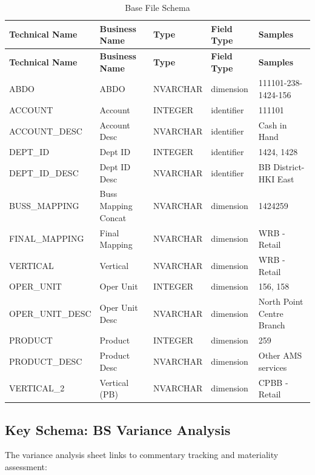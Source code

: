 \documentclass[11pt,a4paper]{article}
\begin{document}
\begin{longtable}{lllll}
\caption{Base File Schema} \\
\toprule
\textbf{Technical Name} & \textbf{Business Name} & \textbf{Type} & \textbf{Field Type} & \textbf{Samples} \\
\midrule
\endfirsthead
\toprule
\textbf{Technical Name} & \textbf{Business Name} & \textbf{Type} & \textbf{Field Type} & \textbf{Samples} \\
\midrule
\endhead
ABDO & ABDO & NVARCHAR & dimension & 111101-238-1424-156 \\
ACCOUNT & Account & INTEGER & identifier & 111101 \\
ACCOUNT\_DESC & Account Desc & NVARCHAR & identifier & Cash in Hand \\
DEPT\_ID & Dept ID & INTEGER & identifier & 1424, 1428 \\
DEPT\_ID\_DESC & Dept ID Desc & NVARCHAR & identifier & BB District-HKI East \\
BUSS\_MAPPING & Buss Mapping Concat & NVARCHAR & dimension & 1424259 \\
FINAL\_MAPPING & Final Mapping & NVARCHAR & dimension & WRB - Retail \\
VERTICAL & Vertical & NVARCHAR & dimension & WRB - Retail \\
OPER\_UNIT & Oper Unit & INTEGER & dimension & 156, 158 \\
OPER\_UNIT\_DESC & Oper Unit Desc & NVARCHAR & dimension & North Point Centre Branch \\
PRODUCT & Product & INTEGER & dimension & 259 \\
PRODUCT\_DESC & Product Desc & NVARCHAR & dimension & Other AMS services \\
VERTICAL\_2 & Vertical (PB) & NVARCHAR & dimension & CPBB - Retail \\
\bottomrule
\end{longtable}

\subsection{Key Schema: BS Variance Analysis}

The variance analysis sheet links to commentary tracking and materiality assessment:
\end{document}
